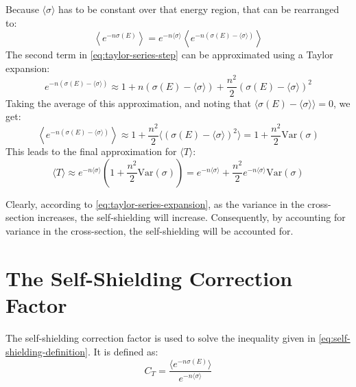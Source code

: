Because $\langle \sigma \rangle$ has to be constant over that energy region, that can be rearranged to:
\begin{equation}
    \label{eq:taylor-series-step}
    \left\langle e^{-n \sigma(E)} \right\rangle = e^{-n \langle \sigma \rangle} \left\langle e^{-n \left( \sigma(E) - \langle \sigma \rangle \right)} \right\rangle
\end{equation}
The second term in \autoref{eq:taylor-series-step} can be approximated using a Taylor expansion:
\begin{equation}
    e^{-n \left( \sigma(E) - \langle \sigma \rangle \right)} \approx 1 + n (\sigma(E) - \langle \sigma \rangle) + \frac{n^{2}}{2} (\sigma(E) - \langle \sigma \rangle)^2
\end{equation}
Taking the average of this approximation, and noting that $\langle \sigma(E) - \langle \sigma \rangle \rangle = 0$, we get:
\begin{equation}
    \left\langle e^{-n \left( \sigma(E) - \langle \sigma \rangle \right)} \right\rangle \approx 1 + \frac{n^{2}}{2} \langle (\sigma(E) - \langle \sigma \rangle)^2 \rangle = 1 + \frac{n^{2}}{2} \text{Var}(\sigma)
\end{equation}
This leads to the final approximation for $\langle T \rangle$:
\begin{equation}
    \label{eq:taylor-series-expansion}
    \langle T \rangle \approx e^{-n \langle \sigma \rangle} \left(1 + \frac{n^{2}}{2} \text{Var}(\sigma) \right) = e^{-n \langle \sigma \rangle} + \frac{n^{2}}{2} e^{-n \langle \sigma \rangle} \text{Var}(\sigma)
\end{equation}

Clearly, according to \autoref{eq:taylor-series-expansion}, as the variance in the cross-section increases, the self-shielding will increase. Consequently, by accounting for variance in the cross-section, the self-shielding will be accounted for.

\section{The Self-Shielding Correction Factor}
\label{sec:correction-factor}

The self-shielding correction factor is used to solve the inequality given in \autoref{eq:self-shielding-definition}. It is defined as:
\begin{equation}
    C_{T} = \frac{\langle e^{-n \sigma (E)} \rangle}{ e ^{- n \langle \sigma \rangle}}
\end{equation}

